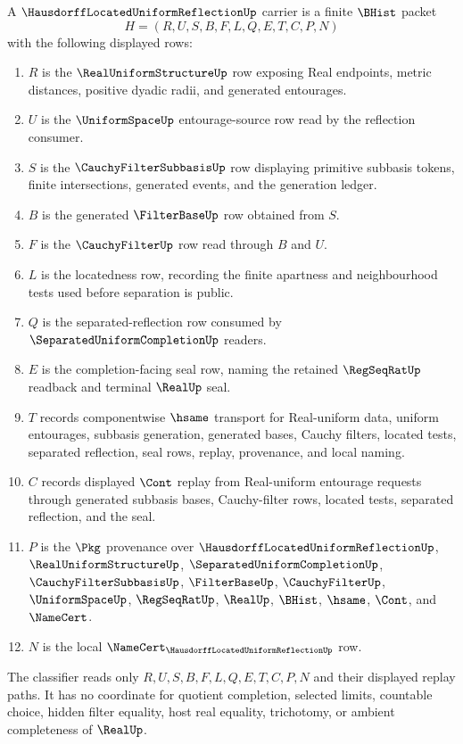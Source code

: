 \begin{definition}
\label{def:hausdorff-located-uniform-reflection-carrier}
A $\HausdorffLocatedUniformReflectionUp$ carrier is a finite $\BHist$ packet
$$
H=(R,U,S,B,F,L,Q,E,T,C,P,N)
$$
with the following displayed rows:
\begin{enumerate}
\item $R$ is the $\RealUniformStructureUp$ row exposing Real endpoints, metric distances, positive dyadic radii, and generated entourages.
\item $U$ is the $\UniformSpaceUp$ entourage-source row read by the reflection consumer.
\item $S$ is the $\CauchyFilterSubbasisUp$ row displaying primitive subbasis tokens, finite intersections, generated events, and the generation ledger.
\item $B$ is the generated $\FilterBaseUp$ row obtained from $S$.
\item $F$ is the $\CauchyFilterUp$ row read through $B$ and $U$.
\item $L$ is the locatedness row, recording the finite apartness and neighbourhood tests used before separation is public.
\item $Q$ is the separated-reflection row consumed by $\SeparatedUniformCompletionUp$ readers.
\item $E$ is the completion-facing seal row, naming the retained $\RegSeqRatUp$ readback and terminal $\RealUp$ seal.
\item $T$ records componentwise $\hsame$ transport for Real-uniform data, uniform entourages, subbasis generation, generated bases, Cauchy filters, located tests, separated reflection, seal rows, replay, provenance, and local naming.
\item $C$ records displayed $\Cont$ replay from Real-uniform entourage requests through generated subbasis bases, Cauchy-filter rows, located tests, separated reflection, and the seal.
\item $P$ is the $\Pkg$ provenance over $\HausdorffLocatedUniformReflectionUp$, $\RealUniformStructureUp$, $\SeparatedUniformCompletionUp$, $\CauchyFilterSubbasisUp$, $\FilterBaseUp$, $\CauchyFilterUp$, $\UniformSpaceUp$, $\RegSeqRatUp$, $\RealUp$, $\BHist$, $\hsame$, $\Cont$, and $\NameCert$.
\item $N$ is the local $\NameCert_{\HausdorffLocatedUniformReflectionUp}$ row.
\end{enumerate}
The classifier reads only $R,U,S,B,F,L,Q,E,T,C,P,N$ and their displayed replay paths. It has no coordinate for quotient completion, selected limits, countable choice, hidden filter equality, host real equality, trichotomy, or ambient completeness of $\RealUp$.
\end{definition}

